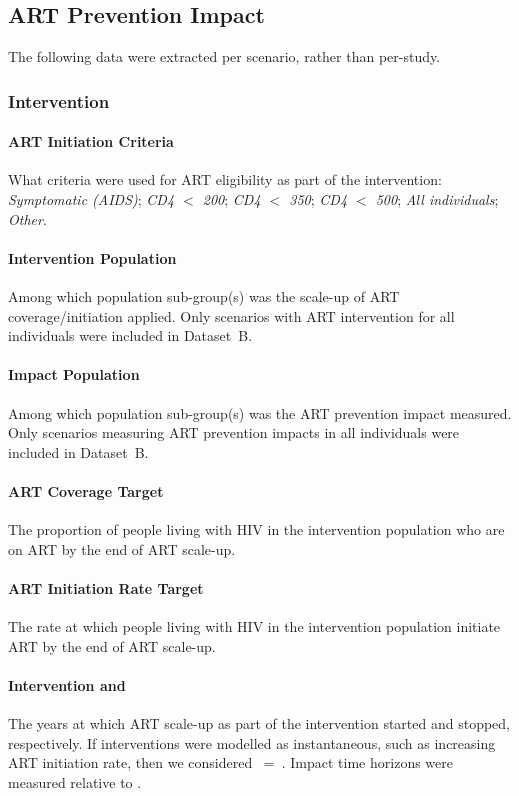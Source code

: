 \subsection{ART Prevention Impact}
\label{aa:defs:api}
The following data were extracted per scenario, rather than per-study.
\subsubsection{Intervention}
\label{aa:defs:interv}
\paragraph{ART Initiation Criteria}
What criteria were used for ART eligibility as part of the intervention:
\emph{Symptomatic (AIDS)};
\emph{CD4 $<$ 200};
\emph{CD4 $<$ 350};
\emph{CD4 $<$ 500};
\emph{All individuals};
\emph{Other}.
\paragraph{Intervention Population}
Among which population sub-group(s) was the scale-up of ART coverage/initiation applied.
Only scenarios with ART intervention for all individuals were included in Dataset~B.
\paragraph{Impact Population}
Among which population sub-group(s) was the ART prevention impact measured.
Only scenarios measuring ART prevention impacts in all individuals were included in Dataset~B.
\paragraph{ART Coverage Target}
The proportion of people living with HIV in the intervention population who are on ART
by the end of ART scale-up.
\paragraph{ART Initiation Rate Target}
The rate at which people living with HIV in the intervention population initiate ART
by the end of ART scale-up.
\paragraph{Intervention  and \thinspace}
The years at which ART scale-up as part of the intervention started and stopped, respectively.
If interventions were modelled as instantaneous, such as increasing ART initiation rate,
then we considered ~=~.
Impact time horizons were measured relative to .
